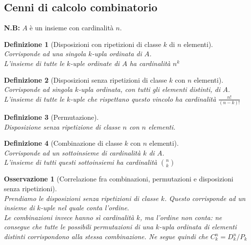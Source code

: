 \documentclass{article}
\newtheorem{definition}{Definizione}[section]
\newtheorem{osservation}{Osservazione}[section]
\begin{document}
    \subsection{Cenni di calcolo combinatorio}
        \textbf{N.B:} $A$ è un insieme con cardinalità $n$. \\
        \begin{definition}[Disposizioni con ripetizioni di classe $k$ di $n$ elementi] \, \\
            Corrisponde ad una singola $k$-upla ordinata di $A$. \\
            L'insieme di tutte le $k$-uple ordinate di $A$ ha cardinalità $n^k$
        \end{definition}
        \begin{definition}[Disposizioni senza ripetizioni di classe $k$ con $n$ elementi] \, \\
            Corrisponde ad singola $k$-upla ordinata, con tutti gli elementi distinti, di $A$. \\
            L'insieme di tutte le $k$-uple che rispettano questo vincolo ha cardinalità $\frac{n!}{\left(n-k\right)!}$
        \end{definition}
        \begin{definition}[Permutazione] \, \\
            Disposizione senza ripetizione di classe $n$ con $n$ elementi. 
        \end{definition}
        \begin{definition}[Combinazione di classe $k$ con $n$ elementi] \, \\
            Corrisponde ad un sottoinsieme di cardinalità $k$ di $A$. \\
            L'insieme di tutti questi sottoinsiemi ha cardinalità $\binom{n}{k}$
        \end{definition}
        \begin{osservation}[Correlazione fra combinazioni, permutazioni e disposizioni senza ripetizioni] \, \\
            Prendiamo le disposizioni senza ripetizioni di classe $k$. Questo corrisponde ad un insieme di 
            $k$-uple nel quale conta l'ordine. \\
            Le combinazioni invece hanno sì cardinalità $k$, ma l'ordine non conta: ne consegue 
            che tutte le possibili permutazioni di una $k$-upla ordinata di elementi distinti 
            corrispondono alla stessa combinazione. Ne segue quindi che $C^n_k = {D^n_k}/{P_k}$
        \end{osservation}
\end{document}
